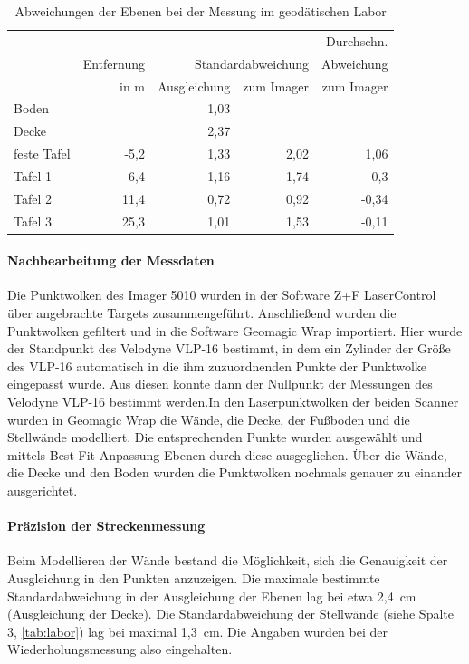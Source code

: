 \documentclass[a4paper,12pt,bibliography=totoc, listof=totoc,titlepage,pointlessnumbers]{scrreprt}
\begin{document}
\begin{table}
\centering
\begin{tabular}{|l|r|r|r|r|}
\cline{2-4}
\hline
		& 		& \multicolumn{2}{r|}{} 	&  Durchschn.\\
		& Entfernung	& \multicolumn{2}{r|}{Standardabweichung} & Abweichung\\
		& in m		& Ausgleichung	& zum Imager 	& zum Imager \\ \hline
Boden		&		& 1,03		&		& 	\\ \hline
Decke		& 	    	& 2,37		&		& 	\\ \hline
feste Tafel	& -5,2		& 1,33		& 2,02		& 1,06	\\ \hline
Tafel 1		& 6,4      	& 1,16		& 1,74		& -0,3	\\ \hline
Tafel 2		& 11,4     	& 0,72		& 0,92		& -0,34	\\ \hline
Tafel 3		& 25,3     	& 1,01		& 1,53		& -0,11	\\ \hline
\end{tabular}
\caption{Abweichungen der Ebenen bei der Messung im geodätischen Labor}
\label{tab:labor}
\end{table}

\paragraph{Nachbearbeitung der Messdaten}
Die Punktwolken des Imager 5010 wurden in der Software Z+F LaserControl über angebrachte Targets zusammengeführt. Anschließend wurden die Punktwolken gefiltert und in die Software Geomagic Wrap importiert. Hier wurde der Standpunkt des Velodyne VLP-16 bestimmt, in dem ein Zylinder der Größe des VLP-16 automatisch in die ihm zuzuordnenden Punkte der Punktwolke eingepasst wurde.  Aus diesen konnte dann der Nullpunkt der Messungen des Velodyne VLP-16 bestimmt werden.In den Laserpunktwolken der beiden Scanner wurden in Geomagic Wrap die Wände, die Decke, der Fußboden und die Stellwände modelliert. Die entsprechenden Punkte wurden ausgewählt und mittels Best-Fit-Anpassung Ebenen durch diese ausgeglichen. Über die Wände, die Decke und den Boden wurden die Punktwolken nochmals genauer zu einander ausgerichtet.

\paragraph{Präzision der Streckenmessung}
Beim Modellieren der Wände bestand die Mög\-lich\-keit, sich die Genauigkeit der Ausgleichung in den Punkten anzuzeigen. Die maximale bestimmte Standardabweichung in der Ausgleichung der Ebenen lag bei etwa 2,4~cm (Ausgleichung der Decke). Die Standardabweichung der Stellwände (siehe Spalte 3, \autoref{tab:labor}) lag bei maximal 1,3~cm. Die Angaben wurden bei der Wiederholungsmessung also eingehalten.
\end{document}
